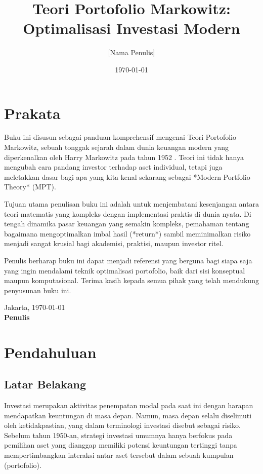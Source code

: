 \documentclass[12pt,a4paper]{book}
\title{Teori Portofolio Markowitz: \\
Optimalisasi Investasi Modern}
\author{[Nama Penulis]}
\date{\today}
\begin{document}
\maketitle

\tableofcontents

\chapter*{Prakata}

Buku ini disusun sebagai panduan komprehensif mengenai Teori Portofolio Markowitz, sebuah tonggak sejarah dalam dunia keuangan modern yang diperkenalkan oleh Harry Markowitz pada tahun 1952 \cite{markowitz1952portfolio}. Teori ini tidak hanya mengubah cara pandang investor terhadap aset individual, tetapi juga meletakkan dasar bagi apa yang kita kenal sekarang sebagai *Modern Portfolio Theory* (MPT).

Tujuan utama penulisan buku ini adalah untuk menjembatani kesenjangan antara teori matematis yang kompleks dengan implementasi praktis di dunia nyata. Di tengah dinamika pasar keuangan yang semakin kompleks, pemahaman tentang bagaimana mengoptimalkan imbal hasil (*return*) sambil meminimalkan risiko menjadi sangat krusial bagi akademisi, praktisi, maupun investor ritel.

Penulis berharap buku ini dapat menjadi referensi yang berguna bagi siapa saja yang ingin mendalami teknik optimalisasi portofolio, baik dari sisi konseptual maupun komputasional. Terima kasih kepada semua pihak yang telah mendukung penyusunan buku ini.

\vspace{1cm}
\noindent Jakarta, \today \\
\textbf{Penulis}

\chapter{Pendahuluan}
\section{Latar Belakang}
Investasi merupakan aktivitas penempatan modal pada saat ini dengan harapan mendapatkan keuntungan di masa depan. Namun, masa depan selalu diselimuti oleh ketidakpastian, yang dalam terminologi investasi disebut sebagai risiko. Sebelum tahun 1950-an, strategi investasi umumnya hanya berfokus pada pemilihan aset yang dianggap memiliki potensi keuntungan tertinggi tanpa mempertimbangkan interaksi antar aset tersebut dalam sebuah kumpulan (portofolio).
\end{document}
